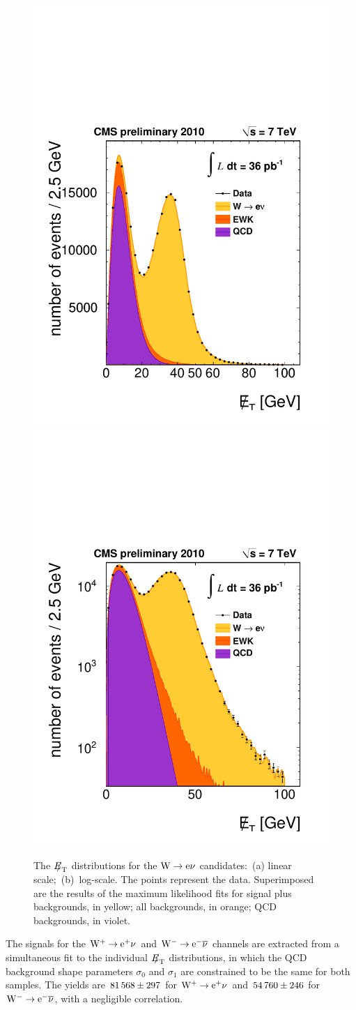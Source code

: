 \begin{figure}[t]
\begin{center}
         \includegraphics[width=.45\textwidth]{figs/w_inc_36pb.pdf}
        \hspace{.05in}
         \includegraphics[width=.45\textwidth]{figs/w_inc_36pb_log.pdf}
        \hspace{.05in}
       \caption{The ${E\!\!\!/}_{\mathrm{T}}$ distributions for the $\mathrm{W} \rightarrow \mathrm{e}\nu$ candidates:~(a)
linear scale;~(b)~log-scale.  The points represent
the data.  Superimposed are the results of the maximum likelihood fits for
signal plus backgrounds, in yellow; all backgrounds, in orange;
QCD backgrounds, in violet.
\label{fig:Wenu} }
\end{center}
\end{figure}


The signals for the $\mathrm{W^+} \rightarrow \mathrm{e}^+\nu$ and $\mathrm{W^-} \rightarrow \mathrm{e}^-\overline{\nu}$ channels are
extracted from a simultaneous fit to the individual ${E\!\!\!/}_{\mathrm{T}}$
distributions, in which the QCD background  shape parameters $\sigma_0$ and
$\sigma_1$ are constrained to be the same for both samples.
The yields are $  81\,568 \pm 297   $ for $\mathrm{W^+} \rightarrow \mathrm{e}^+\nu$ and $  54\,760 \pm 246   $
for $\mathrm{W^-} \rightarrow \mathrm{e}^-\overline{\nu}$, with a negligible correlation.

